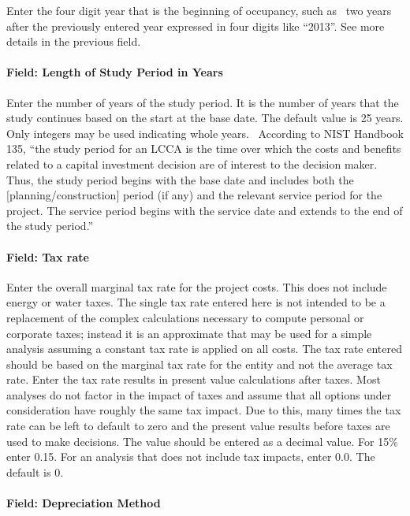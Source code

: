 Enter the four digit year that is the beginning of occupancy, such as~ two years after the previously entered year expressed in four digits like ``2013''. See more details in the previous field.

\paragraph{Field: Length of Study Period in Years}\label{field-length-of-study-period-in-years}

Enter the number of years of the study period. It is the number of years that the study continues based on the start at the base date. The default value is 25 years. Only integers may be used indicating whole years.~ According to NIST Handbook 135, ``the study period for an LCCA is the time over which the costs and benefits related to a capital investment decision are of interest to the decision maker. Thus, the study period begins with the base date and includes both the {[}planning/construction{]} period (if any) and the relevant service period for the project. The service period begins with the service date and extends to the end of the study period.''

\paragraph{Field: Tax rate}\label{field-tax-rate}

Enter the overall marginal tax rate for the project costs. This does not include energy or water taxes. The single tax rate entered here is not intended to be a replacement of the complex calculations necessary to compute personal or corporate taxes; instead it is an approximate that may be used for a simple analysis assuming a constant tax rate is applied on all costs. The tax rate entered should be based on the marginal tax rate for the entity and not the average tax rate. Enter the tax rate results in present value calculations after taxes. Most analyses do not factor in the impact of taxes and assume that all options under consideration have roughly the same tax impact. Due to this, many times the tax rate can be left to default to zero and the present value results before taxes are used to make decisions. The value should be entered as a decimal value. For 15\% enter 0.15. For an analysis that does not include tax impacts, enter 0.0. The default is 0.

\paragraph{Field: Depreciation Method}\label{field-depreciation-method}

